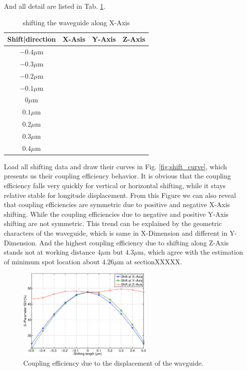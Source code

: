 And all detail are listed in Tab. \ref{tab:shift_result}.
\begin{table}
\caption{shifting the waveguide along X-Axis}
\begin{tabular}{cccc}
\hline
Shift|direction& X-Asis & Y-Axis & Z-Axis \\
\hline
$-0.4\mu$m &\\
$-0.3\mu$m &\\
$-0.2\mu$m&\\
$-0.1\mu$m&\\
$0\mu$m&\\
$0.1\mu$m&\\
$0.2\mu$m&\\
$0.3\mu$m&\\
$0.4\mu$m\\
\hline
\end{tabular}
\label{tab:shift_result}
\end{table}
Load all shifting data and draw their curves in Fig. \ref{fig:shift_curve}, which presents us their coupling efficiency behavior. It is obvious that the coupling efficiency falls very quickly for vertical or horizontal shifting, while it stays relative stable for longitude displacement. From this Figure we can also reveal that coupling efficiencies are symmetric due to positive and negative X-Axis shifting. While the coupling efficiencies due to negative and positive Y-Axis shifting are not symmetric. This trend can be explained by the geometric characters of the waveguide, which is same in X-Dimension and different in Y-Dimension. And the highest coupling efficiency due to shifting along Z-Axis stands not at working distance $4\mu$m but $4.3\mu$m, which agree with the estimation of minimum spot location about $4.26\mu$m at sectionXXXXX.
  
\begin{figure}[!ht]
\centering
\includegraphics[width=0.6\textwidth]{bilder/shift_curve}
\caption{Coupling efficiency due to the displacement of the wavguide.}
\label{fig: shift_curve}
\end{figure}

